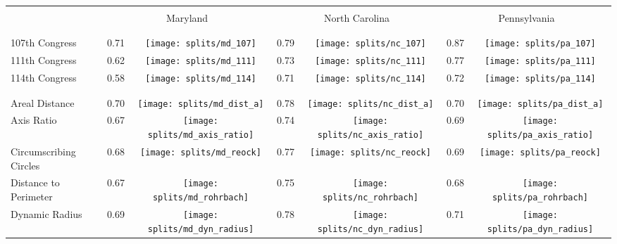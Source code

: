 
\begin{table}
\renewcommand{\arraystretch}{0.7}
 \begin{tabular}{lcccccc}
\hline \hline \\ 
{} & \multicolumn{2}{c}{Maryland} & \multicolumn{2}{c}{North Carolina} & \multicolumn{2}{c}{Pennsylvania} \\
\\ \hline \\
107th Congress         &     0.71 &          \texttt{[image: splits/md\_107]} &           0.79 &          \texttt{[image: splits/nc\_107]} &         0.87 &          \texttt{[image: splits/pa\_107]} \\
111th Congress         &     0.62 &          \texttt{[image: splits/md\_111]} &           0.73 &          \texttt{[image: splits/nc\_111]} &         0.77 &          \texttt{[image: splits/pa\_111]} \\
114th Congress         &     0.58 &          \texttt{[image: splits/md\_114]} &           0.71 &          \texttt{[image: splits/nc\_114]} &         0.72 &          \texttt{[image: splits/pa\_114]} \\
\\ \hline \\ 
Areal Distance         &     0.70 &       \texttt{[image: splits/md\_dist\_a]} &           0.78 &       \texttt{[image: splits/nc\_dist\_a]} &         0.70 &       \texttt{[image: splits/pa\_dist\_a]} \\
Axis Ratio             &     0.67 &   \texttt{[image: splits/md\_axis\_ratio]} &           0.74 &   \texttt{[image: splits/nc\_axis\_ratio]} &         0.69 &   \texttt{[image: splits/pa\_axis\_ratio]} \\
Circumscribing Circles &     0.68 &        \texttt{[image: splits/md\_reock]} &           0.77 &        \texttt{[image: splits/nc\_reock]} &         0.69 &        \texttt{[image: splits/pa\_reock]} \\
Distance to Perimeter  &     0.67 &     \texttt{[image: splits/md\_rohrbach]} &           0.75 &     \texttt{[image: splits/nc\_rohrbach]} &         0.68 &     \texttt{[image: splits/pa\_rohrbach]} \\
Dynamic Radius         &     0.69 &   \texttt{[image: splits/md\_dyn\_radius]} &           0.78 &   \texttt{[image: splits/nc\_dyn\_radius]} &         0.71 &   \texttt{[image: splits/pa\_dyn\_radius]} \\

\end{tabular}
\end{table}
